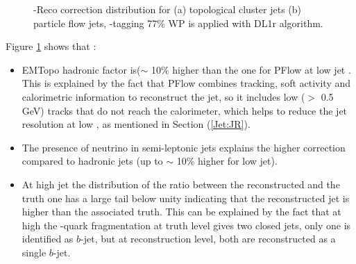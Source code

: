 \begin{figure}[htbp]
   \centering
   \quad
   \begin{tcolorbox}[colback=black!5!white,colframe=white!75!black]
   \caption{\pT-Reco correction distribution for (a) topological cluster jets (b) particle flow jets, \bq-tagging 77\% WP is applied with DL1r algorithm.}
   \label{fig:Jet:Cal:BCal:pTReco}
   \end{tcolorbox}
   
\end{figure}
Figure \ref{fig:Jet:Cal:BCal:pTReco} shows that :
\begin{itemize}
    \item EMTopo hadronic factor is($\sim$ 10\% higher than the one for PFlow at low jet \pT. This is explained by the fact that PFlow combines tracking, soft activity and calorimetric information to reconstruct the jet, so it includes low \pT (\pT $>$ 0.5 GeV) tracks that do not reach the calorimeter, which helps to reduce the jet resolution at low \pT, as mentioned in Section (\ref{Jet:JR}). 
    \item The presence of neutrino in semi-leptonic jets explains the higher correction compared to hadronic jets (up to $\sim$ 10\% higher for low \pT jet).
    \item At high jet \pT the distribution of the ratio between the reconstructed \pT and the truth one has a large tail below unity indicating that the reconstructed jet \pT is higher than the associated truth. This can be explained by the fact that at high \pT the \bq-quark fragmentation at truth level gives two closed jets, only one is identified as $b$-jet, but at reconstruction level, both are reconstructed as a single $b$-jet.
\end{itemize}

